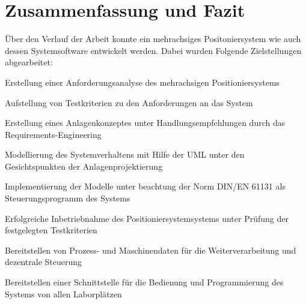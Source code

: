 \documentclass[../../Bachelorarbeit.tex]{subfiles}
\begin{document}
\section{Zusammenfassung und Fazit}
Über den Verlauf der Arbeit konnte ein mehrachsiges Positoniersystem wie auch dessen Systemsoftware entwickelt werden. Dabei wurden Folgende Zielstellungen abgearbeitet:

\bigskip
\begin{compactitem}
	\item Erstellung einer Anforderungsanalyse des mehrachsigen Positioniersystems
	\item Aufstellung von Testkriterien zu den Anforderungen an das System
	\item Erstellung eines Anlagenkonzeptes unter Handlungsempfehlungen durch das Requirements-Engineering
	\item Modellierung des Systemverhaltens mit Hilfe der UML unter den Gesichtspunkten der Anlagenprojektierung
	\item Implementierung der Modelle unter beachtung der Norm DIN/EN 61131 als Steuerungsprogramm des Systems
	\item Erfolgreiche Inbetriebnahme des Positioniersystemsystems unter Prüfung der festgelegten Testkriterien
	\item Bereitstellen von Prozess- und Maschinendaten für die Weiterverarbeitung und dezentrale Steuerung
	\item Bereitstellen einer Schnittstelle für die Bedienung und Programmierung des Systems von allen Laborplätzen
\end{compactitem}
\bigskip
\end{document}

